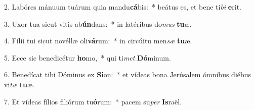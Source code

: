 2. Labóres mánuum tuárum quia mandu\textbf{cá}bis:~*  beátus es, et bene ti\textit{bi} \textbf{e}rit.\

3. Uxor tua sicut vitis ab\textbf{ún}dans:~*  in latéribus do\textit{mus} \textbf{tu}æ.\

4. Fílii tui sicut novéllæ oli\textbf{vá}rum:~*  in circúitu men\textit{sæ} \textbf{tu}æ.\

5. Ecce sic benedicétur \textbf{ho}mo,~*  qui ti\textit{met} \textbf{Dó}minum.\

6. Benedícat tibi Dóminus ex \textbf{Si}on:~*  et vídeas bona Jerúsalem ómnibus diébus vi\textit{tæ} \textbf{tu}æ.\

7. Et vídeas fílios filiórum tu\textbf{ó}rum:~*  pacem su\textit{per} \textbf{Is}raël.\

